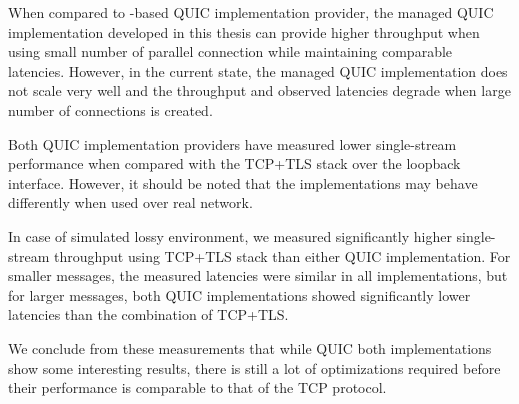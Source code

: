 
When compared to \libmsquic{}-based QUIC implementation provider, the managed QUIC implementation
developed in this thesis can provide higher throughput when using small number of parallel
connection while maintaining comparable latencies. However, in the current state, the managed QUIC
implementation does not scale very well and the throughput and observed latencies degrade when large
number of connections is created.

Both QUIC implementation providers have measured lower single-stream performance when compared with
the TCP+TLS stack over the loopback interface. However, it should be noted that the implementations
may behave differently when used over real network.

In case of simulated lossy environment, we measured significantly higher single-stream throughput
using TCP+TLS stack than either QUIC implementation. For smaller messages, the measured latencies
were similar in all implementations, but for larger messages, both QUIC implementations showed
significantly lower latencies than the combination of TCP+TLS.

We conclude from these measurements that while QUIC both implementations show some interesting
results, there is still a lot of optimizations required before their performance is comparable to
that of the TCP protocol.
